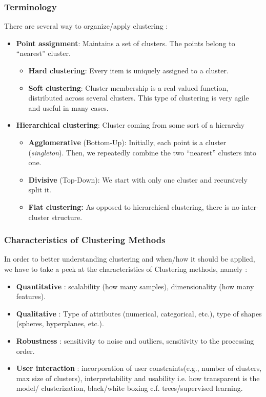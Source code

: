 \subsubsection{Terminology}
There are several way to organize/apply clustering :
\begin{itemize}
  \item \textbf{Point assignment}: Maintains a set of clusters. The points belong to ``nearest'' cluster.
  \begin{itemize}
   \item \textbf{Hard clustering}: Every item is uniquely assigned to a cluster.
   \item \textbf{Soft clustering}: Cluster membership is a real valued function, distributed across several clusters. This type of clustering is very agile and useful in many cases.
  \end{itemize}
  \item \textbf{Hierarchical clustering}: Cluster coming from some sort of a hierarchy
  \begin{itemize}
   \item \textbf{Agglomerative} (Bottom-Up): Initially, each point is a cluster (\emph{singleton}). Then, we repeatedly combine the two ``nearest'' clusters into one.
   \item \textbf{Divisive} (Top-Down): We start with only one cluster and recursively split it.
   \item \textbf{Flat clustering: } As opposed to hierarchical clustering, there is no inter-cluster structure.
  \end{itemize} 
\end{itemize}

\subsubsection{Characteristics of Clustering Methods}

In order to better understanding clustering and when/how it should be applied, we have to take a peek at the characteristics of Clustering methods, namely :
\begin{itemize}
	\item \textbf{Quantitative} : scalability (how many samples), dimensionality (how many features).
	\item \textbf{Qualitative} : Type of attributes (numerical, categorical, etc.), type of shapes (spheres, hyperplanes, etc.).
	\item \textbf{Robustness} : sensitivity to noise and outliers, sensitivity to the processing order.
	\item \textbf{User interaction} : incorporation of user constraints(e.g., number of clusters, max size of clusters), interpretability and usability i.e. how transparent is the model/ clusterization, black/white boxing c.f. trees/supervised learning.
\end{itemize}

